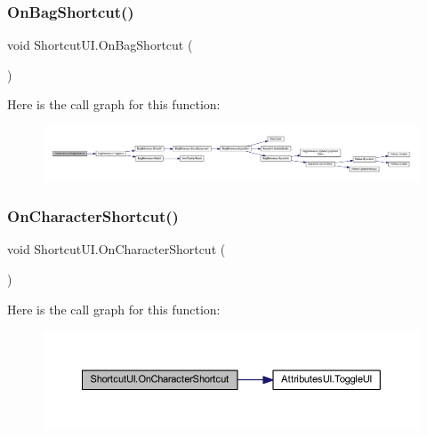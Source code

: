 \subsubsection{\texorpdfstring{OnBagShortcut()}{OnBagShortcut()}}
{\footnotesize\ttfamily void Shortcut\+U\+I.\+On\+Bag\+Shortcut (\begin{DoxyParamCaption}{ }\end{DoxyParamCaption})}

Here is the call graph for this function\+:
\nopagebreak
\begin{figure}[H]
\begin{center}
\leavevmode
\includegraphics[width=350pt]{class_shortcut_u_i_a2434bf0b041a115161fda12022d69f0b_cgraph}
\end{center}
\end{figure}
\mbox{\label{class_shortcut_u_i_aa9dca9d0598a36d8df6555d26e75f176}} 
\subsubsection{\texorpdfstring{OnCharacterShortcut()}{OnCharacterShortcut()}}
{\footnotesize\ttfamily void Shortcut\+U\+I.\+On\+Character\+Shortcut (\begin{DoxyParamCaption}{ }\end{DoxyParamCaption})}

Here is the call graph for this function\+:
\nopagebreak
\begin{figure}[H]
\begin{center}
\leavevmode
\includegraphics[width=350pt]{class_shortcut_u_i_aa9dca9d0598a36d8df6555d26e75f176_cgraph}
\end{center}
\end{figure}
\mbox{\label{class_shortcut_u_i_ac6c1705acfb6d8393f36a73810d94958}} 
